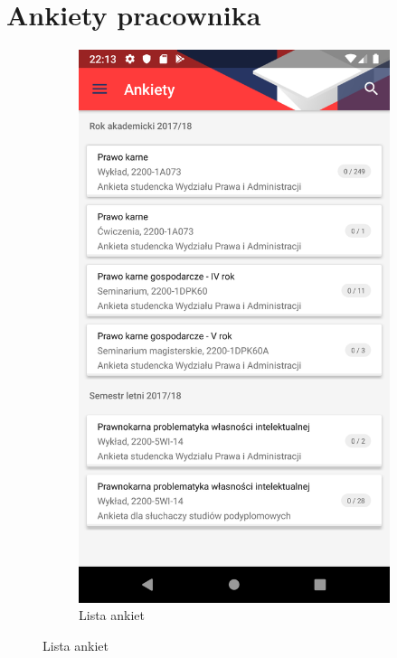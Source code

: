 \documentclass{pracamgr}
\begin{document}
\section{Ankiety pracownika}

\begin{figure}[p]
	\centering
	\begin{subfigure}[t]{0.3\textwidth}
		\includegraphics[width=\textwidth]{img/empsurveys_list.png}
		\caption{Lista ankiet}
		\label{fig:empsurveys_list}
	\end{subfigure}

\end{figure}
\end{document}
